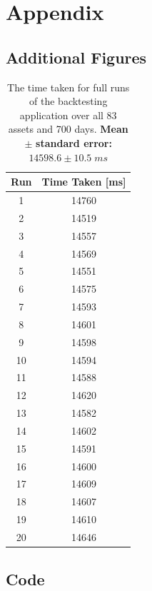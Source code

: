 \documentclass{article}
\begin{document}
\section{Appendix} 
\label{sec:appendix}

\subsection{Additional Figures} 
\label{sec:add_figs}


\begin{center}
\begin{table}[H]
\begin{tabular}{|c c|} 
\hline
Run & Time Taken [ms]  \\ [0.5ex] 
\hline\hline
1 & 14760 \\
\hline
2 & 14519 \\
\hline
3 & 14557 \\
\hline
4 & 14569 \\
\hline
5 & 14551 \\
\hline
6 & 14575 \\
\hline
7 & 14593 \\
\hline
8 & 14601 \\
\hline
9 & 14598 \\
\hline
10 & 14594 \\
\hline
11 & 14588 \\
\hline
12 & 14620 \\
\hline
13 & 14582 \\
\hline
14 & 14602 \\
\hline
15 & 14591 \\
\hline
16 & 14600 \\
\hline
17 & 14609 \\
\hline
18 & 14607 \\
\hline
19 & 14610 \\
\hline
20 & 14646 \\ [1ex] 
\hline
\end{tabular}
\caption{The time taken for full runs of the backtesting application over all 83 assets and 700 days. \textbf{Mean} $\pm$ \textbf{ standard error: } $14598.6 \pm 10.5\;ms$}
\end{table}
\end{center}

\subsection{Code} 
\label{sec:code}
\end{document}
